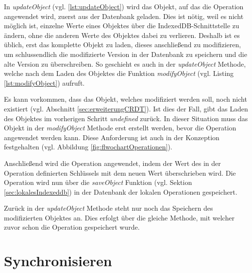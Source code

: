 \documentclass[a4paper, 12pt]{scrreprt}
\begin{document}
\begin{minipage}{\linewidth}
	
\end{minipage}

In \textit{updateObject} (vgl. \ref{lst:updateObject}) wird das Objekt, auf das die Operation angewendet wird, zuerst aus der Datenbank geladen. Dies ist nötig, weil es nicht möglich ist, einzelne Werte eines Objektes über die IndexedDB-Schnittstelle zu ändern, ohne die anderen Werte des Objektes dabei zu verlieren. Deshalb ist es üblich, erst das komplette Objekt zu laden, dieses anschließend zu modifizieren, um schlussendlich die modifizierte Version in der Datenbank zu speichern und die alte Version zu überschreiben. So geschieht es auch in der \textit{updateObject} Methode, welche nach dem Laden des Objektes die Funktion \textit{modifyObject} (vgl. Listing \ref{lst:modifyObject}) aufruft. 

\begin{minipage}{\linewidth}
	
\end{minipage}

Es kann vorkommen, dass das Objekt, welches modifiziert werden soll, noch nicht existiert (vgl. Abschnitt \ref{sec:erweiterungCRDT}). Ist dies der Fall, gibt das Laden des Objektes im vorherigen Schritt \textit{undefined} zurück. In dieser Situation muss das Objekt in der \textit{modifyObject} Methode erst erstellt werden, bevor die Operation angewendet werden kann. Diese Anforderung ist auch in der Konzeption festgehalten (vgl. Abbildung \ref{fig:flwochartOperationen}).

Anschließend wird die Operation angewendet, indem der Wert des in der Operation definierten Schlüssels mit dem neuen Wert überschrieben wird. Die Operation wird nun über die \textit{saveObject} Funktion (vgl. Sektion \ref{sec:lokalesIndexeddb}) in der Datenbank der lokalen Operationen gespeichert.

Zurück in der \textit{updateObject} Methode steht nur noch das Speichern des modifizierten Objektes an. Dies erfolgt über die gleiche Methode, mit welcher zuvor schon die Operation gespeichert wurde.

\section{Synchronisieren}
\end{document}
